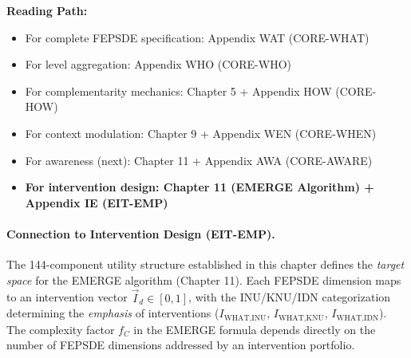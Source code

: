 \begin{cross-reference}
\textbf{Reading Path:}
\begin{itemize}
    \item For complete FEPSDE specification: Appendix WAT (CORE-WHAT)
    \item For level aggregation: Appendix WHO (CORE-WHO)
    \item For complementarity mechanics: Chapter 5 + Appendix HOW (CORE-HOW)
    \item For context modulation: Chapter 9 + Appendix WEN (CORE-WHEN)
    \item For awareness (next): Chapter 11 + Appendix AWA (CORE-AWARE)
    \item \textbf{For intervention design: Chapter 11 (EMERGE Algorithm) + Appendix IE (EIT-EMP)}
\end{itemize}
\end{cross-reference}

\paragraph{Connection to Intervention Design (EIT-EMP).}
The 144-component utility structure established in this chapter defines the \emph{target space}
for the EMERGE algorithm (Chapter 11). Each FEPSDE dimension maps to an intervention vector
$\vec{I}_d \in [0,1]$, with the INU/KNU/IDN categorization determining the \emph{emphasis}
of interventions ($I_{\text{WHAT},\text{INU}}$, $I_{\text{WHAT},\text{KNU}}$, $I_{\text{WHAT},\text{IDN}}$).
The complexity factor $f_C$ in the EMERGE formula depends directly on the number of FEPSDE
dimensions addressed by an intervention portfolio.

